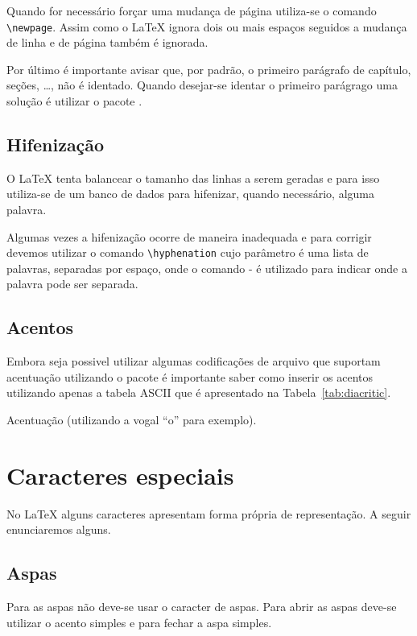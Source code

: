 Quando for necessário forçar uma mudança de página utiliza-se o comando \lstinline!\newpage!. Assim como o LaTeX ignora dois ou mais espaços seguidos a mudança de linha e de página também é ignorada.

Por último é importante avisar que, por padr\~{a}o, o primeiro parágrafo de  capítulo, seções, \dots, não é identado. Quando desejar-se identar o primeiro parágrago uma solução é utilizar o pacote .

\subsection{Hifenização}
O LaTeX tenta balancear o tamanho das linhas a serem geradas e para isso utiliza-se de um banco de dados para hifenizar, quando necessário, alguma palavra.

Algumas vezes a hifenização ocorre de maneira inadequada e para corrigir devemos utilizar o comando \lstinline!\hyphenation! cujo parâmetro é uma lista de palavras, separadas por espaço, onde o comando - é utilizado para indicar onde a palavra pode ser separada.

\subsection{Acentos}
Embora seja possivel utilizar algumas codifica\c{c}\~{o}es de arquivo que suportam acentua\c{c}\~{a}o utilizando o pacote  \'{e} importante saber como inserir os acentos utilizando apenas a tabela ASCII que \'{e} apresentado na Tabela~\ref{tab:diacritic}.
\begin{table}[!htb]
    \centering
    \caption{Acentuação (utilizando a vogal ``o'' para exemplo).} \label{tab:diacritic}
    
\end{table}

\section{Caracteres especiais}
No LaTeX alguns caracteres apresentam forma própria de representação. A seguir enunciaremos alguns.

\subsection{Aspas}
Para as aspas não deve-se usar o caracter de aspas. Para abrir as aspas deve-se utilizar o acento simples e para fechar a aspa simples. \\

